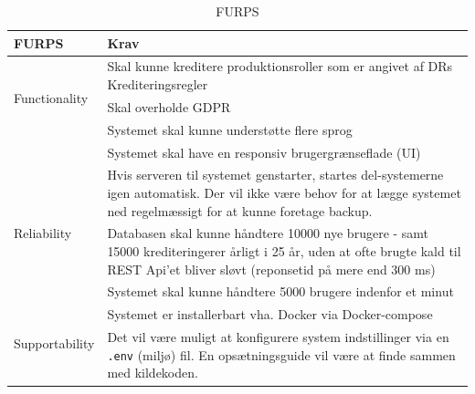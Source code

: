 \begin{table}[ht]
    \centering
    \begin{tabularx}{\textwidth}{|p{4cm}|X|}
        \hline
        \textbf{FURPS}                      & \textbf{Krav} \\ 
        \hline
        \multirow{3}{0}{Functionality}      & Skal kunne kreditere produktionsroller som er angivet af DRs Krediteringsregler  \\ \cline{2-2} 
                                            & Skal overholde GDPR \\ \hline
        \multirow{2}{0}{Usability}          & Systemet skal kunne understøtte flere sprog \\ \cline{2-2}
                                            & Systemet skal have en responsiv brugergrænseflade (UI) \\ \hline
        \multirow{3}{0}{Reliability}        & Hvis serveren til systemet genstarter, startes del-systemerne igen automatisk. Der vil ikke være behov for at lægge systemet ned regelmæssigt for at kunne foretage backup. \\ \hline
        \multirow{4}{0}{Performance}        & Databasen skal kunne håndtere 10000 nye brugere - samt 15000 krediteringerer årligt i 25 år, uden at ofte brugte kald til REST Api'et bliver sløvt (reponsetid på mere end 300 ms) \\ \cline{2-2}
                                            & Systemet skal kunne håndtere 5000 brugere indenfor et minut\\ \hline
        \multirow{4}{0}{Supportability}     & Systemet er installerbart vha. Docker via Docker-compose\\ \cline{2-2}
                                            & Det vil være muligt at konfigurere system indstillinger via en \texttt{.env} (miljø) fil. En opsætningsguide vil være at finde sammen med kildekoden. \\ \hline
    \end{tabularx}
    \caption{FURPS}
    \label{tab:furps}
\end{table}